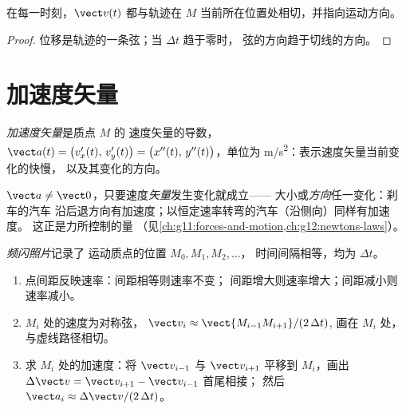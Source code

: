 \begin{proposition}[速度与轨迹相切]\label{prop:g12:kinematics-2d:tangent}
在每一时刻，$\vect v(t)$ 都与轨迹在
$M$ 当前所在位置处相切，并指向运动方向。
\end{proposition}

\begin{proof}
位移是轨迹的一条弦；当 $\Delta t$ 趋于零时，
弦的方向趋于切线的方向。
\end{proof}

\section{加速度矢量}

\begin{definition}[加速度矢量]\label{def:g12:kinematics-2d:acceleration}
\emph{加速度矢量}是质点 $M$ 的
速度矢量的导数，
$\vect a(t) = \bigl(v_x'(t),\, v_y'(t)\bigr) =
\bigl(x''(t),\, y''(t)\bigr)$，单位为 \unit{m/s^2}：表示速度矢量当前变化的快慢，
以及其变化的方向。
\end{definition}

\begin{remark}[加速而速率不变]\label{rem:g12:kinematics-2d:turning}
$\vect a \neq \vect 0$，只要速度\emph{矢量}发生变化就成立——
大小或\emph{方向}任一变化：刹车的汽车
沿后退方向有加速度；以恒定速率转弯的汽车（沿侧向）同样有加速度。
这正是力所控制的量
（见\cref{ch:g11:forces-and-motion,ch:g12:newtons-laws}）。
\end{remark}

\begin{method}[读取频闪照片]\label{met:g12:kinematics-2d:chrono}
\emph{频闪照片}记录了
运动质点的位置 $M_0, M_1, M_2, \dots$，
时间间隔相等，均为 $\Delta t$。
\begin{enumerate}
  \item 点间距反映速率：间距相等则速率不变；
        间距增大则速率增大；间距减小则速率减小。
  \item $M_i$ 处的速度为对称弦，
        $\vect v_i \approx \vect{M_{i-1}M_{i+1}}/(2\,\Delta t)$,
        画在 $M_i$ 处，与虚线路径相切。
  \item 求 $M_i$ 处的加速度：将 $\vect v_{i-1}$ 与
        $\vect v_{i+1}$ 平移到 $M_i$，画出
        $\Delta\vect v = \vect v_{i+1} - \vect v_{i-1}$ 首尾相接；
        然后 $\vect a_i \approx \Delta\vect v/(2\,\Delta t)$。
\end{enumerate}
\end{method}

